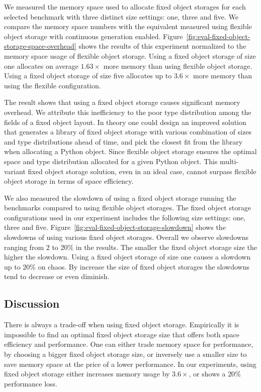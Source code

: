 We measured the memory space used to allocate fixed object storages for each selected benchmark with three distinct size settings: one, three and five.
We compare the memory space numbers with the equivalent measured using flexible object storage with continuous generation enabled.
Figure~\ref{fig:eval-fixed-object-storage-space-overhead} shows the results of this experiment normalized to the memory space usage of flexible object storage.
Using a fixed object storage of size one allocates on average $1.63\times$ more memory than using flexible object storage.
Using a fixed object storage of size five allocates up to $3.6\times$ more memory than using the flexible configuration.

The result shows that using a fixed object storage causes significant memory overhead.
We attribute this inefficiency to the poor type distribution among the fields of a fixed object layout.
In theory one could design an improved solution that generates a library of fixed object storage with various combination of sizes and type distributions ahead of time, and pick the closest fit from the library when allocating a Python object.
Since flexible object storage ensures the optimal space and type distribution allocated for a given Python object.
This multi-variant fixed object storage solution, even in an ideal case, cannot surpass flexible object storage in terms of space efficiency.

We also measured the slowdown of using a fixed object storage running the benchmarks compared to using flexible object storages.
The fixed object storage configurations used in our experiment includes the following size settings: one, three and five.
Figure~\ref{fig:eval-fixed-object-storage-slowdown} shows the slowdowns of using various fixed object storages.
Overall we observe slowdowns ranging from $2$ to $20\%$ in the results.
The smaller the fixed object storage size the higher the slowdown.
Using a fixed object storage of size one causes a slowdown up to $20\%$ on \textsf{chaos}.
By increase the size of fixed object storages the slowdowns tend to decrease or even diminish.

\subsection{Discussion}

There is always a trade-off when using fixed object storage.
Empirically it is impossible to find an optimal fixed object storage size that offers both space efficiency and performance.
One can either trade memory space for performance, by choosing a bigger fixed object storage size,
or inversely use a smaller size to save memory space at the price of a lower performance.
In our experiments, using fixed object storage either increases memory usage by $3.6\times$, or shows a $20\%$ performance loss.

